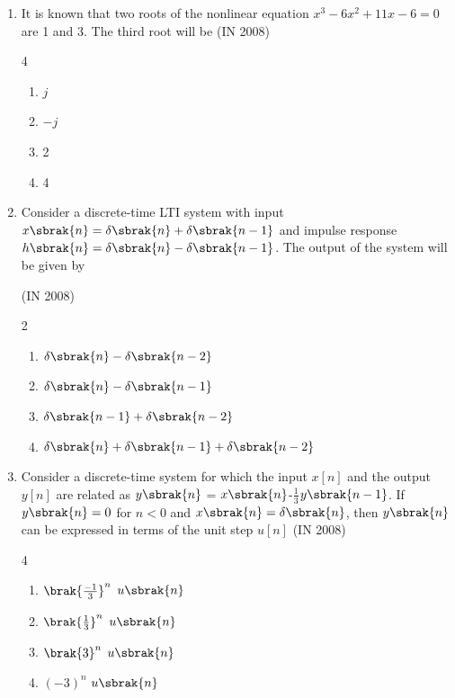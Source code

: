\begin{enumerate}[label=\thesubsection.\arabic*,ref=\thesubsection.\theenumi]
    \item It is known that two roots of the nonlinear equation $x^3 -6x^2 +11x -6 = 0$ are 1 and 3. The third root will be \hfill{(IN 2008)}
    \begin{multicols}{4}
    \begin{enumerate} 
        \item $j$ 
        \item $-j$
        \item 2
        \item 4
    \end{enumerate}
    \end{multicols}

\item  Consider a discrete-time LTI system with input $x\sbrak{n} = \delta \sbrak{n} +\delta\sbrak{n-1} $ and impulse response $h\sbrak{n} =\delta\sbrak{n}-\delta\sbrak{n-1}$. The output of the system will be given by 

	\hfill{(IN 2008)}
\begin{multicols}{2}
  \begin{enumerate} 
        \item $\delta\sbrak{n}-\delta\sbrak{n-2}$
        \item $\delta\sbrak{n}-\delta\sbrak{n-1}$
        \item $\delta\sbrak{n-1}+\delta\sbrak{n-2}$
        \item $\delta\sbrak{n}+\delta\sbrak{n-1}+\delta\sbrak{n-2}$
  \end{enumerate}
  \end{multicols}
  
    \item Consider a discrete-time system for which the input $x[n]$ and the output $y[n]$ are related as $y\sbrak{n}$ = $x\sbrak{n}$-\(\frac{1}{3}\)$y\sbrak{n-1}$. If $y\sbrak{n} = 0$ for $n < 0$ and $x\sbrak{n} = \delta\sbrak{n}$, then $y\sbrak{n}$ can be expressed in terms of the unit step $u[n]$ \hfill{(IN 2008)}
    \begin{multicols}{4}
    \begin{enumerate} 
      \item $\brak{\frac{-1}{3}}^{n}$ $u\sbrak{n}$ 
      \item $\brak{\frac{1}{3}}^{n}$ $u\sbrak{n}$
      \item $\brak{3}^{n}$ $u\sbrak{n}$
      \item $(-3)^{n}$ $u\sbrak{n}$
    \end{enumerate}  
    \end{multicols}



\end{enumerate}
